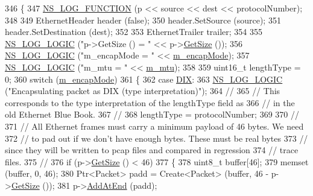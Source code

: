 \begin{DoxyCode}
346 \{
347   \hyperlink{log-macros-disabled_8h_a90b90d5bad1f39cb1b64923ea94c0761}{NS\_LOG\_FUNCTION} (p << source << dest << protocolNumber);
348 
349   EthernetHeader header (\textcolor{keyword}{false});
350   header.SetSource (source);
351   header.SetDestination (dest);
352 
353   EthernetTrailer trailer;
354 
355   \hyperlink{group__logging_ga88acd260151caf2db9c0fc84997f45ce}{NS\_LOG\_LOGIC} (\textcolor{stringliteral}{"p->GetSize () = "} << p->\hyperlink{classns3_1_1Packet_a462855c9929954d4301a4edfe55f4f1c}{GetSize} ());
356   \hyperlink{group__logging_ga88acd260151caf2db9c0fc84997f45ce}{NS\_LOG\_LOGIC} (\textcolor{stringliteral}{"m\_encapMode = "} << \hyperlink{classns3_1_1CsmaNetDevice_a3f4b374840119abfa65dbe2075533f39}{m\_encapMode});
357   \hyperlink{group__logging_ga88acd260151caf2db9c0fc84997f45ce}{NS\_LOG\_LOGIC} (\textcolor{stringliteral}{"m\_mtu = "} << \hyperlink{classns3_1_1CsmaNetDevice_a4b2e70ee2ee42f63f3756728ec592bc1}{m\_mtu});
358 
359   uint16\_t lengthType = 0;
360   \textcolor{keywordflow}{switch} (\hyperlink{classns3_1_1CsmaNetDevice_a3f4b374840119abfa65dbe2075533f39}{m\_encapMode}) 
361     \{
362     \textcolor{keywordflow}{case} \hyperlink{classns3_1_1CsmaNetDevice_a176431468055d41f8e879e33a5362cada8cc8287029197a9496df00c6d3f8b9ff}{DIX}:
363       \hyperlink{group__logging_ga88acd260151caf2db9c0fc84997f45ce}{NS\_LOG\_LOGIC} (\textcolor{stringliteral}{"Encapsulating packet as DIX (type interpretation)"});
364       \textcolor{comment}{//}
365       \textcolor{comment}{// This corresponds to the type interpretation of the lengthType field as}
366       \textcolor{comment}{// in the old Ethernet Blue Book.}
367       \textcolor{comment}{//}
368       lengthType = protocolNumber;
369 
370       \textcolor{comment}{//}
371       \textcolor{comment}{// All Ethernet frames must carry a minimum payload of 46 bytes.  We need}
372       \textcolor{comment}{// to pad out if we don't have enough bytes.  These must be real bytes }
373       \textcolor{comment}{// since they will be written to pcap files and compared in regression }
374       \textcolor{comment}{// trace files.}
375       \textcolor{comment}{//}
376       \textcolor{keywordflow}{if} (p->\hyperlink{classns3_1_1Packet_a462855c9929954d4301a4edfe55f4f1c}{GetSize} () < 46)
377         \{
378           uint8\_t buffer[46];
379           memset (buffer, 0, 46);
380           Ptr<Packet> padd = Create<Packet> (buffer, 46 - p->\hyperlink{classns3_1_1Packet_a462855c9929954d4301a4edfe55f4f1c}{GetSize} ());
381           p->\hyperlink{classns3_1_1Packet_a14ec3d4250b425468764de58f5837b6b}{AddAtEnd} (padd);

\end{DoxyCode}
